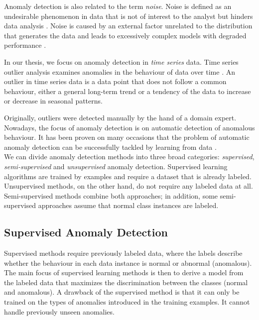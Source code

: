 Anomaly detection is also related to the term \textit{noise}. Noise is defined as an undesirable phenomenon in data that is not of interest to the analyst but hinders data analysis \cite{cvbakv2009}. Noise is caused by an external factor unrelated to the distribution that generates the data \cite{ggh2017} and leads to excessively complex models with degraded performance \cite{wu2007}. 

In our thesis, we focus on anomaly detection in \textit{time series} data. Time series outlier analysis examines anomalies in the behaviour of data over time \cite{gupta2014}. An outlier in time series data is a data point that does not follow a common behaviour, either a general long-term trend or a tendency of the data to increase or decrease in seasonal patterns.

Originally, outliers were detected manually by the hand of a domain expert. 
Nowadays, the focus of anomaly detection is on automatic detection of anomalous behaviour. 
It has been proven on many occasions that the problem of automatic anomaly detection can be successfully tackled by learning from data \cite{he2016} \cite{wang2017timeseriesanomaly}.
\\
We can divide anomaly detection methods into three broad categories: \textit{supervised}, \textit{semi-supervised} and \textit{unsupervised} anomaly detection. Supervised learning algorithms are trained by examples and require a dataset that is already labeled. Unsupervised methods, on the other hand, do not require any labeled data at all. Semi-supervised methods combine both approaches; in addition, some semi-supervised approaches assume that normal class instances are labeled.


\subsection{Supervised Anomaly Detection }
Supervised methods require previously labeled data, where the labels describe whether the behaviour in each data instance is normal or abnormal (anomalous). The main focus of supervised learning methods is then to derive a model from the labeled data that maximizes the discrimination between the classes (normal and anomalous). A drawback of the supervised method is that it can only be trained on the types of anomalies introduced in the training examples. It cannot handle previously unseen anomalies. 

